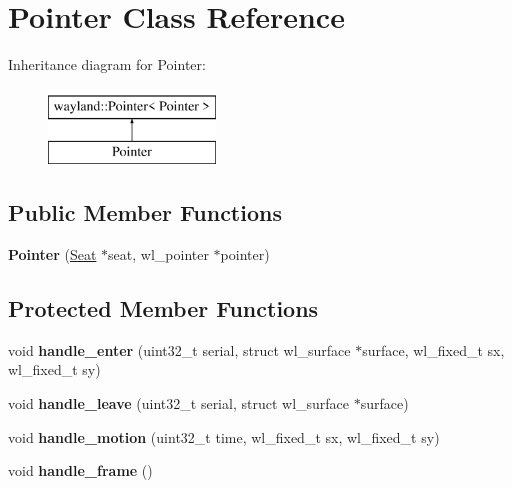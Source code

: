\hypertarget{classPointer}{}\section{Pointer Class Reference}
\label{classPointer}
Inheritance diagram for Pointer\+:\begin{figure}[H]
\begin{center}
\leavevmode
\includegraphics[height=2.000000cm]{classPointer}
\end{center}
\end{figure}
\subsection*{Public Member Functions}
\begin{DoxyCompactItemize}
\item 
\mbox{\label{classPointer_ab376c4b7e5ebfcc9a42bd7afb412c7e1}} 
{\bfseries Pointer} (\mbox{\hyperlink{classSeat}{Seat}} $\ast$seat, wl\+\_\+pointer $\ast$pointer)
\end{DoxyCompactItemize}
\subsection*{Protected Member Functions}
\begin{DoxyCompactItemize}
\item 
\mbox{\label{classPointer_af058f59adc16dd98a781aa917a143864}} 
void {\bfseries handle\+\_\+enter} (uint32\+\_\+t serial, struct wl\+\_\+surface $\ast$surface, wl\+\_\+fixed\+\_\+t sx, wl\+\_\+fixed\+\_\+t sy)
\item 
\mbox{\label{classPointer_a3a78712152765a67ea5927cd3c51b982}} 
void {\bfseries handle\+\_\+leave} (uint32\+\_\+t serial, struct wl\+\_\+surface $\ast$surface)
\item 
\mbox{\label{classPointer_a6d82201d70a82d910328560d5c6ef060}} 
void {\bfseries handle\+\_\+motion} (uint32\+\_\+t time, wl\+\_\+fixed\+\_\+t sx, wl\+\_\+fixed\+\_\+t sy)
\item 
\mbox{\label{classPointer_a0b309cf0d328d9f8197f001d19af243b}} 
void {\bfseries handle\+\_\+frame} ()
\end{DoxyCompactItemize}
